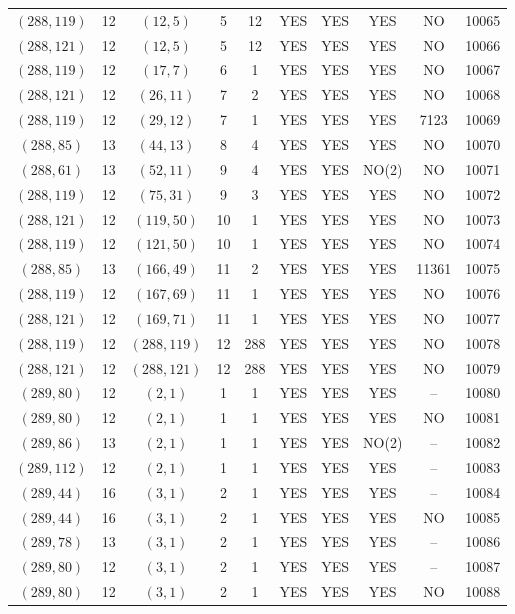 \begin{longtable}{|c|c|c|c|c|c|c|c|c|c|}
$(288, 119)$ & 12 & $(12, 5)$ & 5 & 12 & YES & YES & YES & NO & 10065\\
$(288, 121)$ & 12 & $(12, 5)$ & 5 & 12 & YES & YES & YES & NO & 10066\\
$(288, 119)$ & 12 & $(17, 7)$ & 6 & 1 & YES & YES & YES & NO & 10067\\
$(288, 121)$ & 12 & $(26, 11)$ & 7 & 2 & YES & YES & YES & NO & 10068\\
$(288, 119)$ & 12 & $(29, 12)$ & 7 & 1 & YES & YES & YES & 7123 & 10069\\
$(288, 85)$ & 13 & $(44, 13)$ & 8 & 4 & YES & YES & YES & NO & 10070\\
$(288, 61)$ & 13 & $(52, 11)$ & 9 & 4 & YES & YES & NO(2) & NO & 10071\\
$(288, 119)$ & 12 & $(75, 31)$ & 9 & 3 & YES & YES & YES & NO & 10072\\
$(288, 121)$ & 12 & $(119, 50)$ & 10 & 1 & YES & YES & YES & NO & 10073\\
$(288, 119)$ & 12 & $(121, 50)$ & 10 & 1 & YES & YES & YES & NO & 10074\\
$(288, 85)$ & 13 & $(166, 49)$ & 11 & 2 & YES & YES & YES & 11361 & 10075\\
$(288, 119)$ & 12 & $(167, 69)$ & 11 & 1 & YES & YES & YES & NO & 10076\\
$(288, 121)$ & 12 & $(169, 71)$ & 11 & 1 & YES & YES & YES & NO & 10077\\
$(288, 119)$ & 12 & $(288, 119)$ & 12 & 288 & YES & YES & YES & NO & 10078\\
$(288, 121)$ & 12 & $(288, 121)$ & 12 & 288 & YES & YES & YES & NO & 10079\\
$(289, 80)$ & 12 & $(2, 1)$ & 1 & 1 & YES & YES & YES & -- & 10080\\
$(289, 80)$ & 12 & $(2, 1)$ & 1 & 1 & YES & YES & YES & NO & 10081\\
$(289, 86)$ & 13 & $(2, 1)$ & 1 & 1 & YES & YES & NO(2) & -- & 10082\\
$(289, 112)$ & 12 & $(2, 1)$ & 1 & 1 & YES & YES & YES & -- & 10083\\
$(289, 44)$ & 16 & $(3, 1)$ & 2 & 1 & YES & YES & YES & -- & 10084\\
$(289, 44)$ & 16 & $(3, 1)$ & 2 & 1 & YES & YES & YES & NO & 10085\\
$(289, 78)$ & 13 & $(3, 1)$ & 2 & 1 & YES & YES & YES & -- & 10086\\
$(289, 80)$ & 12 & $(3, 1)$ & 2 & 1 & YES & YES & YES & -- & 10087\\
$(289, 80)$ & 12 & $(3, 1)$ & 2 & 1 & YES & YES & YES & NO & 10088\\

\end{longtable}
